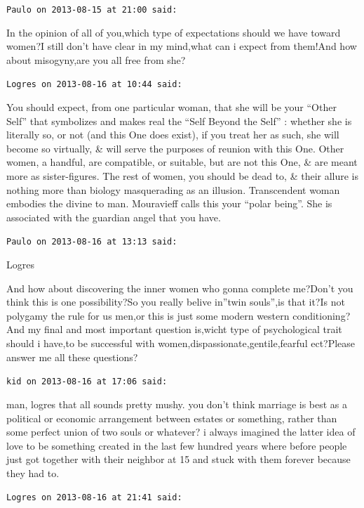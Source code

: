 \begin{footnotesize}
\begin{sffamily}
\hfill

\texttt{Paulo on 2013-08-15 at 21:00 said:}

In the opinion of all of you,which type of expectations should we have toward women?I still don't have clear in my mind,what can i expect from them!And how about misogyny,are you all free from she?

\hfill

\texttt{Logres on 2013-08-16 at 10:44 said:}

You should expect, from one particular woman, that she will be your ``Other Self'' that symbolizes and makes real the ``Self Beyond the Self'' : whether she is literally so, or not (and this One does exist), if you treat her as such, she will become so virtually, \& will serve the purposes of reunion with this One. Other women, a handful, are compatible, or suitable, but are not this One, \& are meant more as sister-figures. The rest of women, you should be dead to, \& their allure is nothing more than biology masquerading as an illusion. Transcendent woman embodies the divine to man. Mouravieff calls this your ``polar being''. She is associated with the guardian angel that you have.

\hfill

\texttt{Paulo on 2013-08-16 at 13:13 said:}

Logres

And how about discovering the inner women who gonna complete me?Don't you think this is one possibility?So you really belive in''twin souls'',is that it?Is not polygamy the rule for us men,or this is just some modern western conditioning?And my final and most important question is,wicht type of psychological trait should i have,to be successful with women,dispassionate,gentile,fearful ect?Please answer me all these questions?

\hfill

\texttt{kid on 2013-08-16 at 17:06 said:}

man, logres that all sounds pretty mushy. you don't think marriage is best as a political or economic arrangement between estates or something, rather than some perfect union of two souls or whatever? i always imagined the latter idea of love to be something created in the last few hundred years where before people just got together with their neighbor at 15 and stuck with them forever because they had to.

\hfill

\texttt{Logres on 2013-08-16 at 21:41 said:}


\end{sffamily}
\end{footnotesize}
